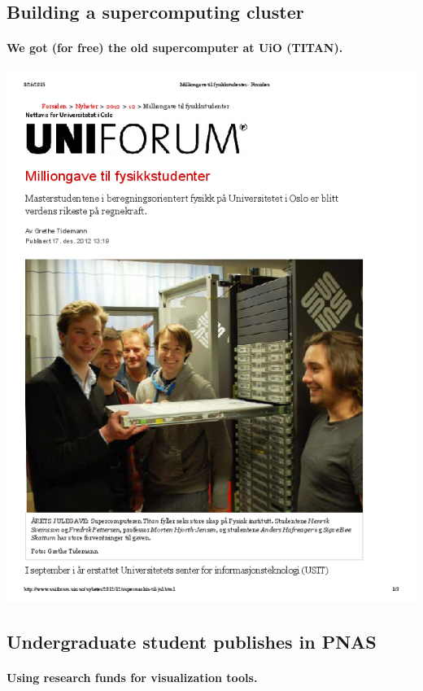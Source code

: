 \documentclass[%
<<<<<<< HEAD
<<<<<<< HEAD
oneside,                 %
final,                   %
=======
twoside,                 %
final,                   %
>>>>>>> 5fc06d357468ca5ec59d2d3ed0179709275f8f00
=======
oneside,                 %
final,                   %
>>>>>>> master
10pt]{article}
\begin{document}
\begin{itemize}
\subsection*{Building a supercomputing cluster}

\paragraph{We got (for free) the old supercomputer at UiO (TITAN).}


\centerline{\includegraphics[width=0.7\linewidth]{fig-future/uniforum-0.png}}




\subsection*{Undergraduate student publishes in PNAS}

\paragraph{Using research funds for visualization tools.}



\end{itemize}
\end{document}
